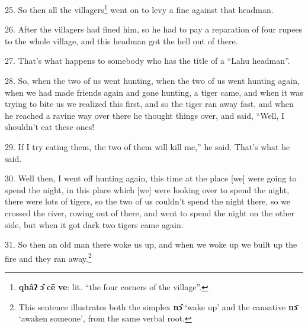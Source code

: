 25. So then all the villagers\footnote{\textbf{qhâʔ} \textbf{ɔ̂} \textbf{cē} \textbf{ve}: lit. ``the four corners of the village''.} went on to levy a fine against that headman.

26. After the villagers had fined him, so he had to pay a reparation of four rupees
to the whole village, and this headman got the hell out of there.

27. That's what happens to somebody who has the title of a ``Lahu headman''.

28. So, when the two of us went hunting, when the two of us went hunting again,
when we had made friends again and gone hunting, a tiger came, and when it was
trying to bite us we realized this first, and so the tiger ran away fast, and when
he reached a ravine way over there he thought things over, and said, ``Well, I
shouldn't eat these ones!

29. If I try eating them, the two of them will kill me,'' he said. That's what he
said.

30. Well then, I went off hunting again, this time at the place [we] were going
to spend the night, in this place which [we] were looking over to spend the night,
there were lots of tigers, so the two of us couldn't spend the night there, so
we crossed the river, rowing out of there, and went to spend the night on the other
side, but when it got dark two tigers came again.

31. So then an old man there woke us up, and when we woke up we built up the fire
and they ran away.\footnote{This sentence illustrates both the simplex \textbf{nɔ̂} `wake up' and the causative \textbf{nɔ̄} `awaken someone', from the same verbal root.}

